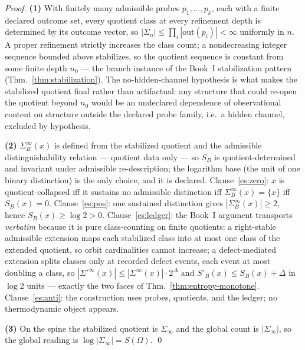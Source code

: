 \documentclass[12pt,oneside]{amsbook}
\theoremstyle{plain}
\theoremstyle{definition}
\theoremstyle{remark}
\begin{document}
\begin{proof}
\textbf{(1)}  With finitely many admissible probes
$p_1, \dots, p_k$, each with a finite declared outcome set, every
quotient class at every refinement depth is determined by its
outcome vector, so $|\Sigma_n| \le \prod_i |\mathrm{out}(p_i)| <
\infty$ uniformly in $n$.  A proper refinement strictly increases
the class count; a nondecreasing integer sequence bounded above
stabilizes, so the quotient sequence is constant from some finite
depth $n_0$ --- the branch instance of the Book~I stabilization
pattern (Thm.~\ref{thm:stabilization}).  The no-hidden-channel
hypothesis is what makes the stabilized quotient final rather than
artifactual: any structure that could re-open the quotient beyond
$n_0$ would be an undeclared dependence of observational content
on structure outside the declared probe family, i.e.\ a hidden
channel, excluded by hypothesis.

\textbf{(2)}  $\Sigma_B^\infty(x)$ is defined from the stabilized
quotient and the admissible distinguishability relation --- quotient
data only --- so $S_B$ is quotient-determined and invariant under
admissible re-description; the logarithm base (the unit of one
binary distinction) is the only choice, and it is declared.
Clause~\ref{es:zero}: $x$ is quotient-collapsed iff it sustains no
admissible distinction iff $\Sigma_B^\infty(x) = \{x\}$ iff
$S_B(x) = 0$.  Clause~\ref{es:pos}: one sustained distinction
gives $|\Sigma_B^\infty(x)| \ge 2$, hence $S_B(x) \ge \log 2 > 0$.
Clause~\ref{es:ledger}: the Book~I argument transports
\emph{verbatim} because it is pure class-counting on finite
quotients: a right-stable admissible extension maps each
stabilized class into at most one class of the extended quotient,
so orbit cardinalities cannot increase; a defect-mediated
extension splits classes only at recorded defect events, each
event at most doubling a class, so
$|\Sigma'^\infty(x)| \le |\Sigma^\infty(x)| \cdot 2^{\Delta}$ and
$S'_B(x) \le S_B(x) + \Delta$ in $\log 2$ units --- exactly the
two faces of Thm.~\ref{thm:entropy-monotone}.
Clause~\ref{es:anti}: the construction uses probes, quotients, and
the ledger; no thermodynamic object appears.

\textbf{(3)}  On the spine the stabilized quotient is
$\Sigma_\infty$ and the global count is $|\Sigma_\infty|$, so the
global reading is $\log|\Sigma_\infty| = S(\Omega)$. \qed
\end{proof}
\end{document}
